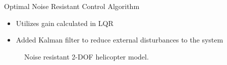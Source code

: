 \documentclass[final]{beamer}
\newlength{\sepwid}
\newlength{\onecolwid}
\begin{document}
\begin{frame}[t]
\begin{columns}[t]
\begin{column}{\onecolwid}
\begin{block}{Optimal Noise Resistant Control Algorithm}
\vskip -1cm
\begin{itemize}
    \item Utilizes gain calculated in LQR
    \item Added Kalman filter to reduce external disturbances to the system
\end{itemize} 
\begin{figure}
    \centering
    \caption{Noise resistant 2-DOF helicopter model.}
    \label{fig:LQGModel}
\end{figure}

\end{block}



\end{column} %

\begin{column}{\sepwid}\end{column} %

\begin{column}{\onecolwid} %


\end{column}
\end{columns}
\end{frame}
\end{document}
